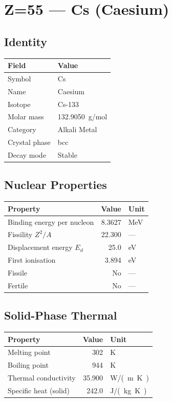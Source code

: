 \documentclass[11pt,a4paper]{article}
\begin{document}
\newpage

\section{Z=55 --- Cs (Caesium)}
\label{sec:Z55}

\subsection{Identity}
\begin{tabular}{ll}
  \toprule
  Field & Value \\
  \midrule
  Symbol & Cs \\
  Name & Caesium \\
  Isotope & Cs-133 \\
  Molar mass & \SI{132.9050}{g/mol} \\
  Category & Alkali Metal \\
  Crystal phase & bcc \\
  Decay mode & Stable \\
  \bottomrule
\end{tabular}

\subsection{Nuclear Properties}
\begin{tabular}{lrl}
  \toprule
  Property & Value & Unit \\
  \midrule
  Binding energy per nucleon & 8.3627 & \si{MeV} \\
  Fissility $Z^2/A$ & 22.300 & --- \\
  Displacement energy $E_d$ & 25.0 & \si{eV} \\
  First ionisation & 3.894 & \si{eV} \\
  Fissile & No & --- \\
  Fertile & No & --- \\
  \bottomrule
\end{tabular}

\subsection{Solid-Phase Thermal}
\begin{tabular}{lrl}
  \toprule
  Property & Value & Unit \\
  \midrule
  Melting point & 302 & \si{K} \\
  Boiling point & 944 & \si{K} \\
  Thermal conductivity & 35.900 & \si{W/(m.K)} \\
  Specific heat (solid) & 242.0 & \si{J/(kg.K)} \\
  \bottomrule
\end{tabular}
\end{document}
